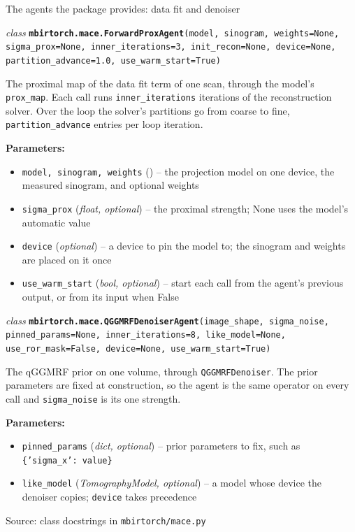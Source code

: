 \documentclass[aspectratio=169,10pt]{beamer}
\newcommand{\tagchip}[2]{{\setlength{\fboxsep}{2.5pt}\setlength{\fboxrule}{0.6pt}%
  \fcolorbox{white}{#1}{\textcolor{white}{\footnotesize\bfseries\strut #2}}}}
\newcommand{\macechip}{\tagchip{planAccent}{MACE}}
\newcommand{\source}[1]{\par\vfill{\scriptsize\textcolor{inkGray}{Source: #1}\par}}
\newcommand{\sig}[3]{\begin{sigbox}\raggedright\scriptsize\hangindent=14pt\hangafter=1
  \textit{#1} \texttt{\textbf{#2}(#3)}\end{sigbox}}
\newenvironment{params}{\par{\scriptsize\textbf{Parameters:}}\par\vspace{-6pt}%
  \begin{itemize}\scriptsize\setlength{\itemsep}{0pt}\setlength{\topsep}{0pt}}{\end{itemize}\vspace{-2pt}}
\newcommand{\param}[3]{\item \texttt{#1} (\textit{#2}) -- #3}
\newcommand{\sigtext}[1]{{\scriptsize #1\par}}
\begin{document}
\begin{frame}{The agents the package provides: data fit and denoiser \hfill \macechip}
  \vspace{2pt}
  \sig{class}{mbirtorch.mace.ForwardProxAgent}{model, sinogram, weights=None, sigma\_prox=None, inner\_iterations=3, init\_recon=None, device=None, partition\_advance=1.0, use\_warm\_start=True}
  \sigtext{The proximal map of the data fit term of one scan, through the
  model's \texttt{prox\_map}.  Each call runs \texttt{inner\_iterations}
  iterations of the reconstruction solver.  Over the loop the solver's
  partitions go from coarse to fine, \texttt{partition\_advance} entries
  per loop iteration.}
  \begin{params}
    \param{model, sinogram, weights}{}{the projection model on one device, the measured sinogram, and optional weights}
    \param{sigma\_prox}{float, optional}{the proximal strength; None uses the model's automatic value}
    \param{device}{optional}{a device to pin the model to; the sinogram and weights are placed on it once}
    \param{use\_warm\_start}{bool, optional}{start each call from the agent's previous output, or from its input when False}
  \end{params}
  \vspace{2pt}
  \sig{class}{mbirtorch.mace.QGGMRFDenoiserAgent}{image\_shape, sigma\_noise, pinned\_params=None, inner\_iterations=8, like\_model=None, use\_ror\_mask=False, device=None, use\_warm\_start=True}
  \sigtext{The qGGMRF prior on one volume, through \texttt{QGGMRFDenoiser}.
  The prior parameters are fixed at construction, so the agent is the same
  operator on every call and \texttt{sigma\_noise} is its one strength.}
  \begin{params}
    \param{pinned\_params}{dict, optional}{prior parameters to fix, such as \texttt{\{'sigma\_x': value\}}}
    \param{like\_model}{TomographyModel, optional}{a model whose device the denoiser copies; \texttt{device} takes precedence}
  \end{params}
  \source{class docstrings in \texttt{mbirtorch/mace.py}}
\end{frame}
\end{document}
